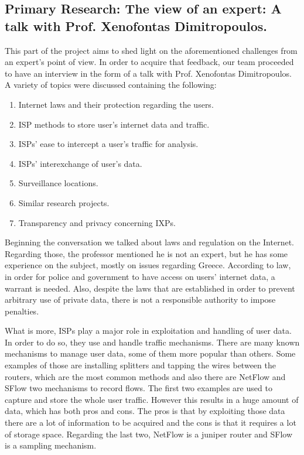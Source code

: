 \vspace{1cm}
\subsection{Primary Research: The view of an expert: A talk with  Prof. 
Xenofontas Dimitropoulos.}
\vspace{0.7cm}

This part of the project aims to shed light on the aforementioned challenges 
from an expert's point of view. In order to acquire that feedback, our team 
proceeded to have an interview in the form of a talk with Prof. Xenofontas 
Dimitropoulos. A variety of topics were discussed containing the following:
\begin{enumerate}
\item{Internet laws and their protection regarding the users.}
\item{ISP methods to store user's internet data and traffic.}
\item{ISPs' ease to intercept a user's traffic for analysis.}
\item{ISPs' interexchange of user's data.}
\item{Surveillance locations.}
\item{Similar research projects.} 
\item{Transparency and privacy concerning IXPs.}
\end{enumerate}

Beginning the conversation we talked about laws and regulation on the Internet. 
Regarding those, the professor mentioned he is not an expert, but he has some 
experience on the subject, mostly on issues regarding Greece. According to law, 
in order for police and government to have access on users’ internet data, a 
warrant is needed. Also, despite the laws that are established in order to 
prevent arbitrary use of private data, there is not a responsible authority to 
impose penalties.

What is more, ISPs play a major role in exploitation and handling of user data. 
In order to do so, they use and handle traffic mechanisms. There are many known 
mechanisms to manage user data, some of them more popular than others. Some 
examples of those are installing splitters and tapping the wires between the 
routers, which are the most common methods and also there are NetFlow and SFlow 
two mechanisms to record flows. The first two examples are used to capture and 
store the whole user traffic. However this results in a huge amount of data, 
which has both pros and cons. The pros is that by exploiting those data there 
are a lot of information to be acquired and the cons is that it requires a lot 
of storage space. Regarding the last two, NetFlow is a juniper router and SFlow 
is a sampling mechanism.

